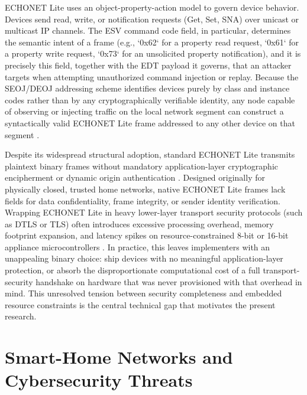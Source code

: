 ECHONET Lite uses an object-property-action model to govern device behavior. Devices send read, write, or notification requests (Get, Set, SNA) over unicast or multicast IP channels. The ESV command code field, in particular, determines the semantic intent of a frame (e.g., `0x62` for a property read request, `0x61` for a property write request, `0x73` for an unsolicited property notification), and it is precisely this field, together with the EDT payload it governs, that an attacker targets when attempting unauthorized command injection or replay. Because the SEOJ/DEOJ addressing scheme identifies devices purely by class and instance codes rather than by any cryptographically verifiable identity, any node capable of observing or injecting traffic on the local network segment can construct a syntactically valid ECHONET Lite frame addressed to any other device on that segment \citep{ECHONETPart2,eissaDevelopingIncentiveDemand2019,murakamiApplicationECHONETLite2016}.

Despite its widespread structural adoption, standard ECHONET Lite transmits plaintext binary frames without mandatory application-layer cryptographic encipherment or dynamic origin authentication \citep{ECHONETPart2,eissaDevelopingIncentiveDemand2019,sangumpaiDevelopmentRealTimeInterworking2017}. Designed originally for physically closed, trusted home networks, native ECHONET Lite frames lack fields for data confidentiality, frame integrity, or sender identity verification. Wrapping ECHONET Lite in heavy lower-layer transport security protocols (such as DTLS or TLS) often introduces excessive processing overhead, memory footprint expansion, and latency spikes on resource-constrained 8-bit or 16-bit appliance microcontrollers \citep{eissaDevelopingIncentiveDemand2019}. In practice, this leaves implementers with an unappealing binary choice: ship devices with no meaningful application-layer protection, or absorb the disproportionate computational cost of a full transport-security handshake on hardware that was never provisioned with that overhead in mind. This unresolved tension between security completeness and embedded resource constraints is the central technical gap that motivates the present research.


\section{Smart-Home Networks and Cybersecurity Threats}

